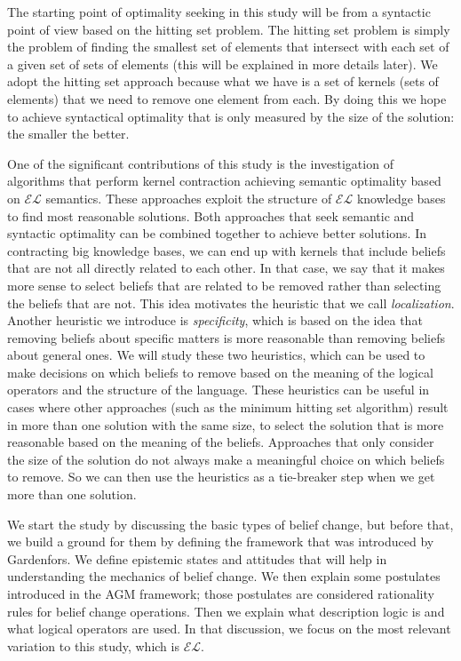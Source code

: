 The starting point of optimality seeking in this study will be from a syntactic point of view based on the hitting set problem. The hitting set problem is simply the problem of finding the smallest set of elements that intersect with each set of a given set of sets of elements (this will be explained in more details later). We adopt the hitting set approach because what we have is a set of kernels (sets of elements) that we need to remove one element from each. By doing this we hope to achieve syntactical optimality that is only measured by the size of the solution: the smaller the better. 

One of the significant contributions of this study is the investigation of algorithms that perform kernel contraction achieving semantic optimality based on $\mathcal{EL}$ semantics. These approaches exploit the structure of $\mathcal{EL}$ knowledge bases to find most reasonable solutions. Both approaches that seek semantic and syntactic optimality can be combined together to achieve better solutions. In contracting big knowledge bases, we can end up with kernels that include beliefs that are not all directly related to each other. In that case, we say that it makes more sense to select beliefs that are related to be removed rather than selecting the beliefs that are not. This idea motivates the heuristic that we call \textit{localization}. Another heuristic we introduce is \textit{specificity}, which is based on the idea that removing beliefs about specific matters is more reasonable than removing beliefs about general ones. We will study these two heuristics, which can be used to make decisions on which beliefs to remove based on the meaning of the logical operators and the structure of the language. These heuristics can be useful in cases where other approaches (such as the minimum hitting set algorithm) result in more than one solution with the same size, to select the solution that is more reasonable based on the meaning of the beliefs. Approaches that only consider the size of the solution do not always make a meaningful choice on which beliefs to remove. So we can then use the heuristics as a tie-breaker step when we get more than one solution.

We start the study by discussing the basic types of belief change, but before that, we build a ground for them by defining the framework that was introduced by Gardenfors. We define epistemic states and attitudes that will help in understanding the mechanics of belief change. We then explain some postulates introduced in the AGM framework; those postulates are considered rationality rules for belief change operations. Then we explain what description logic is and what logical operators are used. In that discussion, we focus on the most relevant variation to this study, which is $\mathcal{EL}$. 

